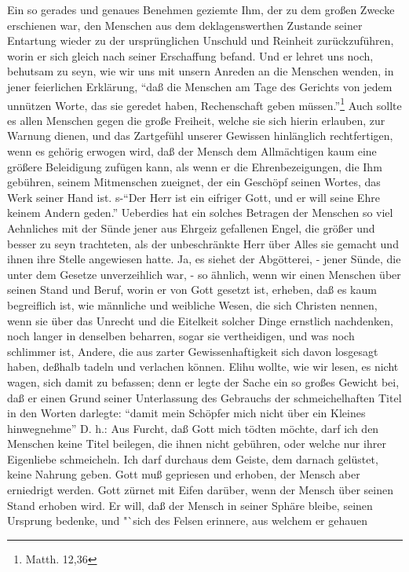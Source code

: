 Ein so gerades und genaues Benehmen geziemte Ihm, der zu dem großen Zwecke
erschienen war, den Menschen aus dem deklagenswerthen Zustande seiner Entartung
wieder zu der ursprünglichen Unschuld und Reinheit zurückzuführen, worin er sich
gleich nach seiner Erschaffung befand. Und er lehret uns noch, behutsam zu seyn,
wie wir uns mit unsern Anreden an die Menschen wenden, in jener feierlichen
Erklärung, "`daß die Menschen am Tage des Gerichts von jedem unnützen Worte, das
sie geredet haben, Rechenschaft geben müssen."'\footnote{Matth. 12,36} Auch
sollte es allen Menschen gegen die große Freiheit, welche sie sich hierin
erlauben, zur Warnung dienen, und das Zartgefühl unserer Gewissen hinlänglich
rechtfertigen, wenn es gehörig erwogen wird, daß der Mensch dem Allmächtigen
kaum eine größere Beleidigung zufügen kann, als wenn er die Ehrenbezeigungen,
die Ihm gebühren, seinem Mitmenschen zueignet, der ein Geschöpf seinen Wortes,
das Werk seiner Hand ist. s-"`Der Herr ist ein eifriger Gott, und er will seine
Ehre keinem Andern geden."' Ueberdies hat ein solches Betragen der Menschen so
viel Aehnliches mit der Sünde jener aus Ehrgeiz gefallenen Engel, die größer und
besser zu seyn trachteten, als der unbeschränkte Herr über Alles sie gemacht und
ihnen ihre Stelle angewiesen hatte. Ja, es siehet der Abgötterei, - jener Sünde,
die unter dem Gesetze unverzeihlich war, - so ähnlich, wenn wir einen Menschen
über seinen Stand und Beruf, worin er von Gott gesetzt ist, erheben, daß es kaum
begreiflich ist, wie männliche und weibliche Wesen, die sich Christen nennen,
wenn sie über das Unrecht und die Eitelkeit solcher Dinge ernstlich nachdenken,
noch langer in denselben beharren, sogar sie vertheidigen, und was noch
schlimmer ist, Andere, die aus zarter Gewissenhaftigkeit sich davon losgesagt
haben, deßhalb tadeln und verlachen können. Elihu wollte, wie wir lesen, es
nicht wagen, sich damit zu befassen; denn er legte der Sache ein so großes
Gewicht bei, daß er einen Grund seiner Unterlassung des Gebrauchs der
schmeichelhaften Titel in den Worten darlegte: "`damit mein Schöpfer mich nicht
über ein Kleines hinwegnehme"' D. h.: Aus Furcht, daß Gott mich tödten möchte,
darf ich den Menschen keine Titel beilegen, die ihnen nicht gebühren, oder
welche nur ihrer Eigenliebe schmeicheln. Ich darf durchaus dem Geiste, dem
darnach gelüstet, keine Nahrung geben. Gott muß gepriesen und erhoben, der
Mensch aber erniedrigt werden. Gott zürnet mit Eifen darüber, wenn der Mensch
über seinen Stand erhoben wird. Er will, daß der Mensch in seiner Sphäre bleibe,
seinen Ursprung bedenke, und "`sich des Felsen erinnere, aus welchem er gehauen
